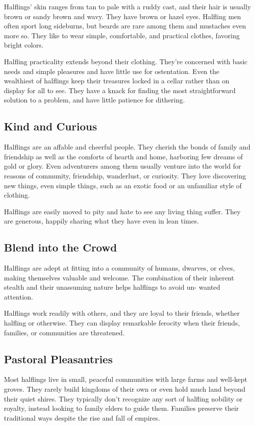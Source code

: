 Halflings’ skin ranges from tan to pale with a ruddy cast, and their hair is usually brown or sandy brown and wavy. They have brown or hazel eyes. Halfling men often sport long sideburns, but beards are rare among them and mustaches even more so. They like to wear simple, comfortable, and practical clothes, favoring bright colors.

Halfling practicality extends beyond their clothing. They’re concerned with basic needs and simple pleasures and have little use for ostentation. Even the wealthiest of halflings keep their treasures locked in a cellar rather than on display for all to see. They have a knack for finding the most straightforward solution to a problem, and have little patience for dithering.

\subsection{Kind and Curious}
Halflings are an affable and cheerful people. They cherish the bonds of family and friendship as well as the comforts of hearth and home, harboring few dreams of gold or glory. Even adventurers among them usually venture into the world for reasons of community, friendship, wanderlust, or curiosity. They love discovering new things, even simple things, such as an exotic food or an unfamiliar style of clothing.

Halflings are easily moved to pity and hate to see any living thing suffer. They are generous, happily sharing what they have even in lean times.

\subsection{Blend into the Crowd}
Halflings are adept at fitting into a community of humans, dwarves, or elves, making themselves valuable and welcome. The combination of their inherent stealth and their unassuming nature helps halflings to avoid un- wanted attention.

Halflings work readily with others, and they are loyal to their friends, whether halfling or otherwise. They can display remarkable ferocity when their friends, families, or communities are threatened.

\subsection{Pastoral Pleasantries}
Most halflings live in small, peaceful communities with large farms and well-kept groves. They rarely build kingdoms of their own or even hold much land beyond their quiet shires. They typically don’t recognize any sort of halfling nobility or royalty, instead looking to family elders to guide them. Families preserve their traditional ways despite the rise and fall of empires.

